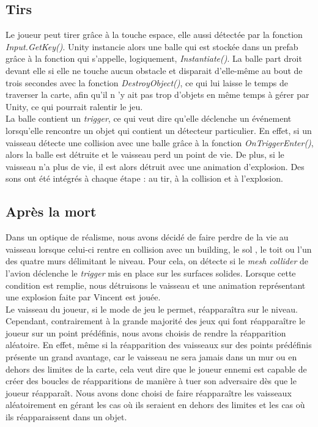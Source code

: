 \documentclass[12pt, titlepage]{article}
\begin{document}
\begin{spacing}{1.5}
\newpage
\subsection{Tirs}

Le joueur peut tirer grâce à la touche espace, elle aussi détectée par la fonction \textit{Input.GetKey()}. Unity instancie alors une balle qui est stockée dans un prefab grâce à la fonction qui s'appelle, logiquement, \textit{Instantiate()}. La balle part droit devant elle si elle ne touche aucun obstacle et disparait d'elle-même au bout de trois secondes avec la fonction \textit{DestroyObject()}, ce qui lui laisse le temps de traverser la carte, afin qu'il n 'y ait pas trop d'objets en même temps à gérer par Unity, ce qui pourrait ralentir le jeu.\\

La balle contient un \textit{trigger}, ce qui veut dire qu'elle déclenche un événement lorsqu'elle rencontre un objet qui contient un détecteur particulier. En effet, si un vaisseau détecte une collision avec une balle grâce à la fonction \textit{OnTriggerEnter()}, alors la balle est détruite et le vaisseau perd un point de vie. De plus, si le vaisseau n'a plus de vie, il est alors détruit avec une animation d'explosion. Des sons ont été intégrés à chaque étape : au tir, à la collision et à l'explosion.\\

\newpage
\subsection{Après la mort}

Dans un optique de réalisme, nous avons décidé de faire perdre de la vie au vaisseau lorsque celui-ci rentre en collision avec un building, le sol , le toit ou l'un des quatre murs délimitant le niveau. Pour cela, on détecte si le \textit{mesh collider} de l'avion déclenche le \textit{trigger} mis en place sur les surfaces solides. Lorsque cette condition est remplie, nous détruisons le vaisseau et une animation représentant une explosion faite par Vincent est jouée.\\
 
Le vaisseau du joueur, si le mode de jeu le permet, réapparaîtra sur le niveau. Cependant, contrairement à la grande majorité des jeux qui font réapparaître le joueur sur un point prédéfinis, nous avons choisis de rendre la réapparition aléatoire. En effet, même si la réapparition des vaisseaux sur des points prédéfinis présente un grand avantage, car le vaisseau ne sera jamais dans un mur ou en dehors des limites de la carte, cela veut dire que le joueur ennemi est capable de créer des boucles de réapparitions de manière à tuer son adversaire dès que le joueur réapparaît. Nous avons donc choisi de faire réapparaître les vaisseaux aléatoirement en gérant les cas où ils seraient en dehors des limites et les cas où ils réapparaissent dans un objet.\\
 

\end{spacing}
\end{document}
